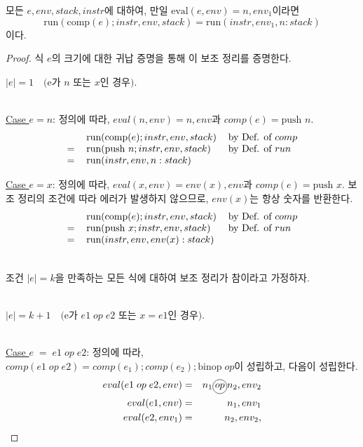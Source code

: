 \documentclass[runningheads]{llncs}
\newcommand{\circledop}[1]{%
    \tikz[baseline=(X.base)] \node[draw, shape=circle, inner sep=1pt] (X) {\ensuremath{#1}};%
}
\begin{document}
\begin{lemma}
\label{lem:compcorrect}
    모든 \( e, env, stack, instr \)에 대하여,  
    만일 \( \text{eval}(e, env) = n, env_1 \)이라면  
    \[
    \text{run}(\text{comp}(e); instr, env, stack) = \text{run}(instr, env_1, n : stack)
    \]
    이다.
\end{lemma}
\begin{proof}
식 $e$의 크기에 대한 귀납 증명을 통해 이 보조 정리를 증명한다. 

$|e| = 1 \quad \text{(e가 } n \text{ 또는 } x \text{인 경우)}$.

\ \\

\underline{Case $e=n$}: 정의에 따라, $eval(n,env)=n,env$과 $comp(e)=\text{push } n$.
\[
\begin{tabular}{l l l}
       & $\text{run}(\text{comp}(e); instr, env, stack)$  & by Def. of $comp$\\
   $=$ & $\text{run}(\text{push } n; instr, env, stack)$ & by Def. of $run$\\
   $=$ & $\text{run}(instr, env, n : stack)$ & \\
\end{tabular}
\]

\underline{Case $e=x$}: 
정의에 따라, $eval(x,env)=env(x),env$과 $comp(e)=\text{push } x$.
보조 정리의 조건에 따라 에러가 발생하지 않으므로, $env(x)$는 항상 숫자를 반환한다.
\[
\begin{tabular}{l l l}
       & $\text{run}(\text{comp}(e); instr, env, stack)$  & by Def. of $comp$\\
   $=$ & $\text{run}(\text{push } x; instr, env, stack)$ & by Def. of $run$\\
   $=$ & $\text{run}(instr, env, env(x) : stack)$ & \\
\end{tabular}
\]

\ \\

조건 $|e| = k $을 만족하는 모든 식에 대하여 보조 정리가 참이라고 가정하자.

\ \\

$|e| = k+1 \quad \text{(e가 } e1 \; op \; e2 \text{ 또는 } x=e1 \text{인 경우)}$.

\ \\

\underline{Case $e\; = \; e1 \; op \; e2$}: 
정의에 따라, $comp(e1 \; op \; e2)=comp(e_1); comp(e_2); \text{binop} \; op$이 성립하고,
다음이 성립한다.
\begin{eqnarray}
    eval(e1 \; op \; e2,env)  & = & n_1 \circledop{op} n_2,env_2 \\
    eval(e1,env) & = & n_1,env_1 \label{lab:opee1env1} \\
    eval(e2,env_1) & = & n_2,env_2, \label{lab:opee2env2}
\end{eqnarray}


\end{proof}
\end{document}
